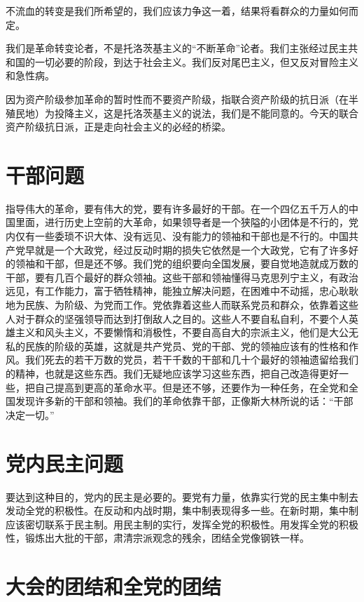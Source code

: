 不流血的转变是我们所希望的，我们应该力争这一着，结果将看群众的力量如何而定。

我们是革命转变论者，不是托洛茨基主义的“不断革命”论者。我们主张经过民主共和国的一切必要的阶段，到达于社会主义。我们反对尾巴主义，但又反对冒险主义和急性病。

因为资产阶级参加革命的暂时性而不要资产阶级，指联合资产阶级的抗日派（在半殖民地）为投降主义，这是托洛茨基主义的说法，我们是不能同意的。今天的联合资产阶级抗日派，正是走向社会主义的必经的桥梁。

\section{干部问题}

指导伟大的革命，要有伟大的党，要有许多最好的干部。在一个四亿五千万人的中国里面，进行历史上空前的大革命，如果领导者是一个狭隘的小团体是不行的，党内仅有一些委琐不识大体、没有远见、没有能力的领袖和干部也是不行的。中国共产党早就是一个大政党，经过反动时期的损失它依然是一个大政党，它有了许多好的领袖和干部，但是还不够。我们党的组织要向全国发展，要自觉地造就成万数的干部，要有几百个最好的群众领袖。这些干部和领袖懂得马克思列宁主义，有政治远见，有工作能力，富于牺牲精神，能独立解决问题，在困难中不动摇，忠心耿耿地为民族、为阶级、为党而工作。党依靠着这些人而联系党员和群众，依靠着这些人对于群众的坚强领导而达到打倒敌人之目的。这些人不要自私自利，不要个人英雄主义和风头主义，不要懒惰和消极性，不要自高自大的宗派主义，他们是大公无私的民族的阶级的英雄，这就是共产党员、党的干部、党的领袖应该有的性格和作风。我们死去的若干万数的党员，若干千数的干部和几十个最好的领袖遗留给我们的精神，也就是这些东西。我们无疑地应该学习这些东西，把自己改造得更好一些，把自己提高到更高的革命水平。但是还不够，还要作为一种任务，在全党和全国发现许多新的干部和领袖。我们的革命依靠干部，正像斯大林所说的话：“干部决定一切。”

\section{党内民主问题}

要达到这种目的，党内的民主是必要的。要党有力量，依靠实行党的民主集中制去发动全党的积极性。在反动和内战时期，集中制表现得多一些。在新时期，集中制应该密切联系于民主制。用民主制的实行，发挥全党的积极性。用发挥全党的积极性，锻炼出大批的干部，肃清宗派观念的残余，团结全党像钢铁一样。

\section{大会的团结和全党的团结}

